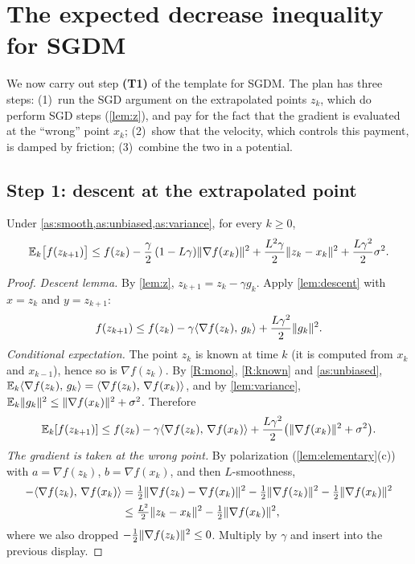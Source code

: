 \section{The expected decrease inequality for SGDM}\label{sec:master}

We now carry out step \textbf{(T1)} of the template for SGDM. The plan has three steps:
(1)~run the SGD argument on the extrapolated points $z_k$, which do perform SGD steps
(\cref{lem:z}), and pay for the fact that the gradient is evaluated at the ``wrong'' point
$x_k$; (2)~show that the velocity, which controls this payment, is damped by friction;
(3)~combine the two in a potential.

\subsection{Step 1: descent at the extrapolated point}

\begin{lemma}\label{lem:z-descent}
Under \cref{as:smooth,as:unbiased,as:variance}, for every $k\ge0$,
\begin{equation}\label{eq:z-descent}
  \mathbb{E}_k\bigl[f(z_{k+1})\bigr]\le f(z_k)-\frac\gamma2\,(1-L\gamma)\lVert \nabla f(x_k)\rVert^2
  +\frac{L^2\gamma}{2}\lVert z_k-x_k\rVert^2+\frac{L\gamma^2}{2}\sigma^2 .
\end{equation}
\end{lemma}

\begin{proof}
\emph{Descent lemma.} By \cref{lem:z}, $z_{k+1}=z_k-\gamma g_k$. Apply
\cref{lem:descent} with $x=z_k$ and $y=z_{k+1}$:
\[
  f(z_{k+1})\le f(z_k)-\gamma\langle \nabla f(z_k),\, g_k\rangle+\frac{L\gamma^2}{2}\lVert g_k\rVert^2 .
\]
\emph{Conditional expectation.} The point $z_k$ is known at time $k$ (it is computed from
$x_k$ and $x_{k-1}$), hence so is $\nabla f(z_k)$. By \ref{R:mono}, \ref{R:known} and
\cref{as:unbiased}, $\mathbb{E}_k\langle \nabla f(z_k),\, g_k\rangle=\langle \nabla f(z_k),\, \nabla f(x_k)\rangle$, and by
\cref{lem:variance}, $\mathbb{E}_k\lVert g_k\rVert^2\le\lVert \nabla f(x_k)\rVert^2+\sigma^2$. Therefore
\[
  \mathbb{E}_k[f(z_{k+1})]\le f(z_k)-\gamma\langle \nabla f(z_k),\, \nabla f(x_k)\rangle
  +\frac{L\gamma^2}{2}\bigl(\lVert \nabla f(x_k)\rVert^2+\sigma^2\bigr).
\]
\emph{The gradient is taken at the wrong point.} By polarization
(\cref{lem:elementary}(c)) with $a=\nabla f(z_k)$, $b=\nabla f(x_k)$, and then
$L$-smoothness,
\begin{align*}
  -\langle \nabla f(z_k),\, \nabla f(x_k)\rangle
  &=\tfrac12\lVert \nabla f(z_k)-\nabla f(x_k)\rVert^2-\tfrac12\lVert \nabla f(z_k)\rVert^2-\tfrac12\lVert \nabla f(x_k)\rVert^2\\
  &\le\tfrac{L^2}{2}\lVert z_k-x_k\rVert^2-\tfrac12\lVert \nabla f(x_k)\rVert^2,
\end{align*}
where we also dropped $-\frac12\lVert \nabla f(z_k)\rVert^2\le0$. Multiply by $\gamma$ and
insert into the previous display.
\end{proof}

